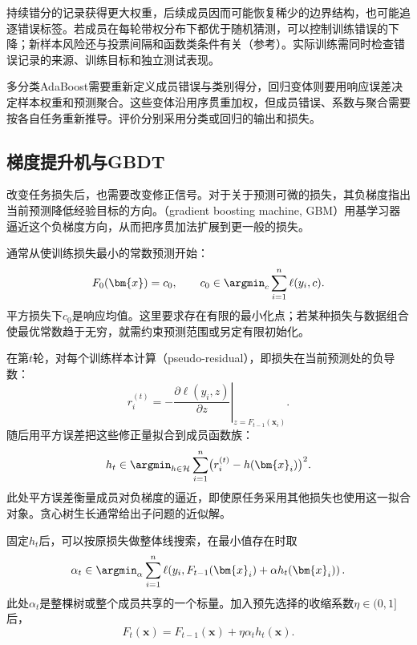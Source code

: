 持续错分的记录获得更大权重，后续成员因而可能恢复稀少的边界结构，也可能追逐错误标签。若成员在每轮带权分布下都优于随机猜测，可以控制训练错误的下降；新样本风险还与投票间隔和函数类条件有关（参考）。实际训练需同时检查错误记录的来源、训练目标和独立测试表现。

多分类AdaBoost需要重新定义成员错误与类别得分，回归变体则要用响应误差决定样本权重和预测聚合。这些变体沿用序贯重加权，但成员错误、系数与聚合需要按各自任务重新推导。评价分别采用分类或回归的输出和损失。

\subsection{梯度提升机与GBDT}
\label{sec:ensemble-gradient-boosting}

改变任务损失后，也需要改变修正信号。对于关于预测可微的损失，其负梯度指出当前预测降低经验目标的方向。（gradient boosting machine, GBM）用基学习器逼近这个负梯度方向，从而把序贯加法扩展到更一般的损失。

通常从使训练损失最小的常数预测开始：
\begin{equation}
  F_0(\bm{x})=c_0,
  \qquad
  c_0\in\argmin_c\sum_{i=1}^{n}\ell(y_i,c).
  \label{eq:ensemble-gbm-initialization}
\end{equation}
平方损失下$c_0$是响应均值。这里要求存在有限的最小化点；若某种损失与数据组合使最优常数趋于无穷，就需约束预测范围或另定有限初始化。

在第$t$轮，对每个训练样本计算（pseudo-residual），即损失在当前预测处的负导数：
\begin{equation}
  r_i^{(t)}
  =
  -
  \left.
  \frac{\partial \ell(y_i,z)}{\partial z}
  \right|_{z=F_{t-1}(\bm{x}_i)}.
  \label{eq:ensemble-pseudo-residual}
\end{equation}
随后用平方误差把这些修正量拟合到成员函数族：
\begin{equation}
  h_t\in\argmin_{h\in\mathcal{H}}
  \sum_{i=1}^{n}\bigl(r_i^{(t)}-h(\bm{x}_i)\bigr)^2.
  \label{eq:ensemble-gbm-gradient-fit}
\end{equation}
此处平方误差衡量成员对负梯度的逼近，即使原任务采用其他损失也使用这一拟合对象。贪心树生长通常给出子问题的近似解。

固定$h_t$后，可以按原损失做整体线搜索，在最小值存在时取
\begin{equation}
  \alpha_t\in\argmin_\alpha
  \sum_{i=1}^{n}
  \ell\!\left(y_i,F_{t-1}(\bm{x}_i)+\alpha h_t(\bm{x}_i)\right).
  \label{eq:ensemble-gbm-line-search}
\end{equation}
此处$\alpha_t$是整棵树或整个成员共享的一个标量。加入预先选择的收缩系数$\eta\in(0,1]$后，
\begin{equation}
  F_t(\bm{x})
  =
  F_{t-1}(\bm{x})
  +
  \eta\alpha_t h_t(\bm{x}).
  \label{eq:ensemble-gradient-boosting-update}
\end{equation}


